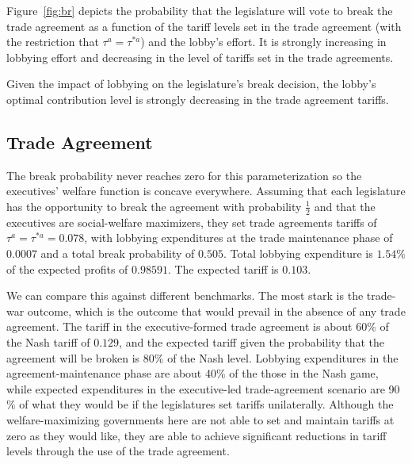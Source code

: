 \documentclass[10pt]{article}
\begin{document}
Figure~\ref{fig:br} depicts the probability that the legislature will vote to break the trade agreement as a function of the tariff levels set in the trade agreement (with the restriction that $\tau^a = \tau^{*a}$) and the lobby's effort. It is strongly increasing in lobbying effort and decreasing in the level of tariffs set in the trade agreements.

Given the impact of lobbying on the legislature's break decision, the lobby's optimal contribution level is strongly decreasing in the trade agreement tariffs.%

\subsection{Trade Agreement}
The break probability never reaches zero for this parameterization so the executives' welfare function is concave everywhere. Assuming that each legislature has the opportunity to break the agreement with probability $\frac{1}{2}$ and that the executives are social-welfare maximizers, they set trade agreements tariffs of $\tau^a = \tau^{*a} = 0.078$, with lobbying expenditures at the trade maintenance phase of $0.0007$ and a total break probability of $0.505$. Total lobbying expenditure is $1.54\%$ of the expected profits of $0.98591$. The expected tariff is $0.103$.

We can compare this against different benchmarks. The most stark is the trade-war outcome, which is the outcome that would prevail in the absence of any trade agreement. The tariff in the executive-formed trade agreement is about 60$\%$ of the Nash tariff of $0.129$, and the expected tariff given the probability that the agreement will be broken is 80$\%$ of the Nash level. Lobbying expenditures in the agreement-maintenance phase are about 40$\%$ of the those in the Nash game, while expected expenditures in the executive-led trade-agreement scenario are 90$\%$ of what they would be if the legislatures set tariffs unilaterally. Although the welfare-maximizing governments here are not able to set and maintain tariffs at zero as they would like, they are able to achieve significant reductions in tariff levels through the use of the trade agreement.
\end{document}
